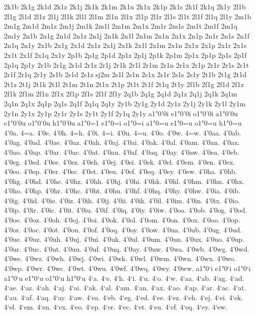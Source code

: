 {2k1b
2k1g
2k1d
2k1z
2k1j
2k1k
2k1m
2k1n
2k1x
2k1p
2k1s
2k1f
2k1q
2k1y
2l1b
2l1g
2l1d
2l1z
2l1j
2l1k
2l1l
2l1m
2l1n
2l1x
2l1p
2l1r
2l1s
2l1t
2l1f
2l1q
2l1y
2m1b
2m1g
2m1d
2m1z
2m1j
2m1k
2m1l
2m1m
2m1x
2m1r
2m1s
2m1t
2m1f
2m1q
2m1y
2n1b
2n1g
2n1d
2n1z
2n1j
2n1k
2n1l
2n1m
2n1n
2n1x
2n1p
2n1r
2n1s
2n1f
2n1q
2n1y
2x1b
2x1g
2x1d
2x1z
2x1j
2x1k
2x1l
2x1m
2x1n
2x1x
2x1p
2x1r
2x1s
2x1t
2x1f
2x1q
2x1y
2p1b
2p1g
2p1d
2p1z
2p1j
2p1k
2p1m
2p1x
2p1p
2p1s
2p1f
2p1q
2p1y
2r1b
2r1g
2r1d
2r1z
2r1j
2r1k
2r1l
2r1m
2r1n
2r1x
2r1p
2r1r
2r1s
2r1t
2r1f
2r1q
2r1y
2s1b
2s1d
2s1z
sj2m
2s1l
2s1n
2s1x
2s1r
2s1s
2s1y
2t1b
2t1g
2t1d
2t1z
2t1j
2t1k
2t1l
2t1m
2t1n
2t1x
2t1p
2t1t
2t1f
2t1q
2t1y
2f1b
2f1g
2f1d
2f1z
2f1k
2f1m
2f1n
2f1x
2f1p
2f1s
2f1f
2f1y
2q1b
2q1g
2q1d
2q1z
2q1j
2q1k
2q1m
2q1n
2q1x
2q1p
2q1s
2q1f
2q1q
2q1y
2y1b
2y1g
2y1d
2y1z
2y1j
2y1k
2y1l
2y1m
2y1n
2y1x
2y1p
2y1r
2y1s
2y1t
2y1f
2y1q
2y1y
a1"0'0i
e1"0'0i
o1"0'0i
a1"0'0u
e1"0'0u
o1"0'0u
h1"0'0u
a1"0=1
e1"0=i
o1"0=i
a1"0=u
e1"0=u
o1"0=u
h1"0=u
4'0a.
4=a.
4'0e.
4'0h.
4=h.
4'0i.
4=i.
4'0u.
4=u.
4'0o.
4'0w.
4=w.
4'0aa.
4'0ab.
4'0ag.
4'0ad.
4'0ae.
4'0az.
4'0ah.
4'0aj.
4'0ai.
4'0ak.
4'0al.
4'0am.
4'0an.
4'0ax.
4'0ao.
4'0ap.
4'0ar.
4'0ac.
4'0at.
4'0au.
4'0af.
4'0aq.
4'0ay.
4'0aw.
4'0ea.
4'0eb.
4'0eg.
4'0ed.
4'0ee.
4'0ez.
4'0eh.
4'0ej.
4'0ei.
4'0ek.
4'0el.
4'0em.
4'0en.
4'0ex.
4'0eo.
4'0ep.
4'0er.
4'0ec.
4'0et.
4'0eu.
4'0ef.
4'0eq.
4'0ey.
4'0ew.
4'0ha.
4'0hb.
4'0hg.
4'0hd.
4'0he.
4'0hz.
4'0hh.
4'0hj.
4'0hi.
4'0hk.
4'0hl.
4'0hm.
4'0hn.
4'0hx.
4'0ho.
4'0hp.
4'0hr.
4'0hc.
4'0ht.
4'0hu.
4'0hf.
4'0hq.
4'0hy.
4'0hw.
4'0ia.
4'0ib.
4'0ig.
4'0id.
4'0ie.
4'0iz.
4'0ih.
4'0ij.
4'0ii.
4'0ik.
4'0il.
4'0im.
4'0in.
4'0ix.
4'0io.
4'0ip.
4'0ir.
4'0ic.
4'0it.
4'0iu.
4'0if.
4'0iq.
4'0iy.
4'0iw.
4'0oa.
4'0ob.
4'0og.
4'0od.
4'0oe.
4'0oz.
4'0oh.
4'0oj.
4'0oi.
4'0ok.
4'0ol.
4'0om.
4'0on.
4'0ox.
4'0oo.
4'0op.
4'0or.
4'0oc.
4'0ot.
4'0ou.
4'0of.
4'0oq.
4'0oy.
4'0ow.
4'0ua.
4'0ub.
4'0ug.
4'0ud.
4'0ue.
4'0uz.
4'0uh.
4'0uj.
4'0ui.
4'0uk.
4'0ul.
4'0um.
4'0un.
4'0ux.
4'0uo.
4'0up.
4'0ur.
4'0uc.
4'0ut.
4'0uu.
4'0uf.
4'0uq.
4'0uy.
4'0uw.
4'0wa.
4'0wb.
4'0wg.
4'0wd.
4'0we.
4'0wz.
4'0wh.
4'0wj.
4'0wi.
4'0wk.
4'0wl.
4'0wm.
4'0wn.
4'0wx.
4'0wo.
4'0wp.
4'0wr.
4'0wc.
4'0wt.
4'0wu.
4'0wf.
4'0wq.
4'0wy.
4'0ww.
a1"0`i
e1"0`i
o1"0`i
a1"0`u
e1"0`u
o1"0`u
h1"0`u
4`a.
4`e.
4`h.
4`i.
4`u.
4`o.
4`w.
4`aa.
4`ab.
4`ag.
4`ad.
4`ae.
4`az.
4`ah.
4`aj.
4`ai.
4`ak.
4`al.
4`am.
4`an.
4`ax.
4`ao.
4`ap.
4`ar.
4`ac.
4`at.
4`au.
4`af.
4`aq.
4`ay.
4`aw.
4`ea.
4`eb.
4`eg.
4`ed.
4`ee.
4`ez.
4`eh.
4`ej.
4`ei.
4`ek.
4`el.
4`em.
4`en.
4`ex.
4`eo.
4`ep.
4`er.
4`ec.
4`et.
4`eu.
4`ef.
4`eq.
4`ey.
4`ew.
}
